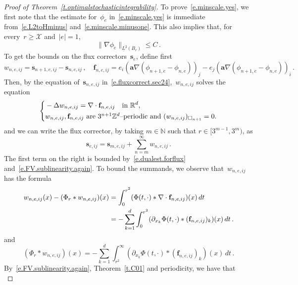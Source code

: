 \documentclass[11pt]{article} %
\let\oldsquare\square %
\renewcommand{\square}{\oldsquare}
\numberwithin{equation}{section}
\theoremstyle{definition}
\let\originalleft\left
\let\originalright\right
\renewcommand{\left}{\mathopen{}\mathclose\bgroup\originalleft}
\renewcommand{\right}{\aftergroup\egroup\originalright}
\newcommand*{\N}{\ensuremath{\mathbb{N}}}
\newcommand*{\Z}{\ensuremath{\mathbb{Z}}}
\newcommand*{\R}{\ensuremath{\mathbb{R}}}
\newcommand{\f}{\mathbf{f}}
\newcommand{\s}{\mathbf{s}}
\renewcommand{\a}{\mathbf{a}}
\newcommand{\cu}{\square}
\newcommand{\X}{\mathcal{X}}
\begin{document}
\begin{proof}[Proof of Theorem~\ref{t.optimalstochasticintegrability}]
To prove~\eqref{e.minscale.yes}, we first note that the estimate for~$\phi_e$ in~\eqref{e.minscale.yes} is immediate from~\eqref{e.L2toHminus} and~\eqref{e.minscale.minusone}. 
This also implies that, for every~$r \geq \X$ and~$|e|=1$,
\begin{equation}
\label{e.corrbounds}
\| \nabla \phi_e \|_{\underline{L}^2(B_r)}
\leq C\,.
\end{equation}
To get the bounds on the flux correctors~$\s_e$, define first 
\begin{equation*}  
w_{n,e,ij} = \s_{n+1,e,ij} - \s_{n,e,ij} 
\,, \quad 
\f_{n,e,ij} = e_i (\a\nabla( \phi_{n+1,e} {-} \phi_{n,e}) )_j  - e_j (\a\nabla( \phi_{n+1,e} {-} \phi_{n,e}) )_i \,.
\end{equation*}
Then, by the equation of~$\s_{n,e,ij}$ in~\eqref{e.fluxcorrect.sec24},~$w_{n,e,ij}$ solves the equation 
\begin{equation*}
\left\{
\begin{aligned}
&
-\Delta w_{n,e,ij} = \nabla \cdot \f_{n,e,ij}
\quad \mbox{in}  \ \R^d, \\
& w_{n,e,ij} , \f_{n,e,ij}  \ \mbox{are $3^{n+1}\Z^d$--periodic and} \ ( w_{n,e,ij} )_{\cu_{n+1}} = 0.
\end{aligned}
\right. 
\end{equation*}
and we can  write the flux corrector, by taking $m\in \N$ such that $r \in [3^{m-1},3^m)$, as
\begin{equation*}  
\s_{e,ij} = \s_{m,e,ij} +  \sum_{n=m}^\infty w_{n,e,ij} \,.
\end{equation*}
The first term on the right is bounded by~\eqref{e.dualest.forflux} and~\eqref{e.FV.sublinearity.again}. To bound the summands, we observe that~$w_{n,e,ij}$ has the formula
\begin{align}
\label{e.w.present1}
w_{n,e,ij}(x) - (\Phi_r \ast w_{n,e,ij})(x) 
& 
=
\int_0^{r^2} ( \Phi(t,\cdot) \ast \nabla \cdot \f_{n,e,ij} )(x) \, dt
\notag \\
& 
=
- \sum_{k=1}^d \int_0^{r^2}  (\partial_{x_k} \Phi(t,\cdot) \ast  (\f_{n,e,ij})_k )(x) \, dt 
\,.
\end{align}
and 
\begin{equation}  \label{e.w.present2}
(\Phi_r \ast w_{n,e,ij})(x)  = - \sum_{k=1}^d \int_{r^2}^\infty  (\partial_{x_k} \Phi(t,\cdot) \ast  (\f_{n,e,ij})_k )(x) \, dt  \,.
\end{equation}
By~\eqref{e.FV.sublinearity.again}, Theorem~\ref{t.C01} and periodicity, we have that
\begin{equation}  \label{e.w.fbound}

\end{equation}
\end{proof}
\end{document}
